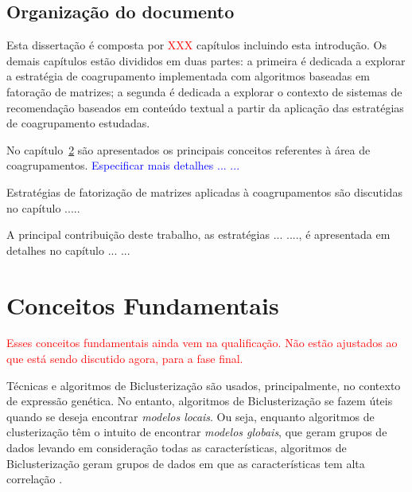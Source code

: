 \documentclass[
    12pt,                %
    oneside,            %
    a4paper,            %
    english,            %
    brazil                %
    ]{abntex2ppgsi}
\begin{document}


\section{Organização do documento}

Esta dissertação é composta por \textcolor{red}{XXX} capítulos incluindo esta introdução. Os demais capítulos estão divididos em duas partes: a primeira é dedicada a explorar a estratégia  de coagrupamento implementada com algoritmos baseadas em fatoração de matrizes; a segunda é dedicada a explorar o contexto de sistemas de recomendação baseados em conteúdo textual a partir da aplicação das estratégias de coagrupamento estudadas.

No capítulo~\ref{ch:conceitos} são apresentados os principais conceitos referentes à área de coagrupamentos. \textcolor{blue}{Especificar mais detalhes ... ... }

Estratégias de fatorização de matrizes aplicadas à coagrupamentos são discutidas no capítulo .....

A principal contribuição deste trabalho, as estratégias ... ...., é apresentada em detalhes no capítulo ... ...



\chapter{Conceitos Fundamentais}
\label{ch:conceitos}

\textcolor{red}{Esses conceitos fundamentais ainda vem na qualificação. Não estão ajustados ao que está sendo discutido agora, para a fase final.}

Técnicas e algoritmos de Biclusterização são usados, principalmente, no contexto de expressão genética. No entanto, algoritmos de Biclusterização se fazem úteis quando se deseja encontrar \textit{modelos locais}. Ou seja, enquanto algoritmos de clusterização têm o intuito de encontrar \textit{modelos globais}, que geram grupos de dados levando em consideração todas as características, algoritmos de Biclusterização geram grupos de dados em que as características tem alta correlação \cite{Franca2010,Madeira2004}.
\end{document}
